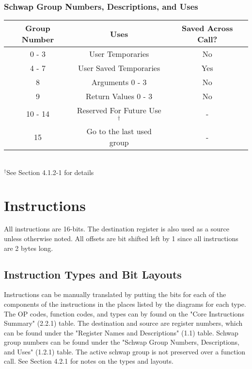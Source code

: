\documentclass{article}
\begin{document}
		\subsubsection{Schwap Group Numbers, Descriptions, and Uses}
			\begin{center}
				\begin{tabular}{| c | c | c |}
					\hline
				    	Group Number & Uses                      & Saved Across Call? \\ \hline
					    0 - 3        & User Temporaries          & No \\ \hline
					    4 - 7        & User Saved Temporaries    & Yes\\ \hline
					    8            & Arguments 0 - 3           & No \\ \hline
					    9            & Return Values 0 - 3       & No \\ \hline
					    10 - 14      & Reserved For Future Use$^\dagger$ & -  \\ \hline
					    15           & Go to the last used group & -  \\
					\hline
				\end{tabular} \\
				$^\dagger$See Section 4.1.2-1 for details
			\end{center}
\newpage
\section{Instructions}
	All instructions are 16-bits.  The destination register is also used as a source unless otherwise noted.  All offsets are bit shifted left by 1 since all instructions are 2 bytes long.
	\subsection{Instruction Types and Bit Layouts}
		Instructions can be manually translated by putting the bits for each of the components of the instructions in the places listed by the diagrams for each type.  The OP codes, function codes, and types can by found on the "Core Instructions Summary" (2.2.1) table.  The destination and source are register numbers, which can be found under the "Register Names and Descriptions" (1.1) table.  Schwap group numbers can be found under the "Schwap Group Numbers, Descriptions, and Uses" (1.2.1) table.  The active schwap group is not preserved over a function call.  See Section 4.2.1 for notes on the types and layouts.
\end{document}
